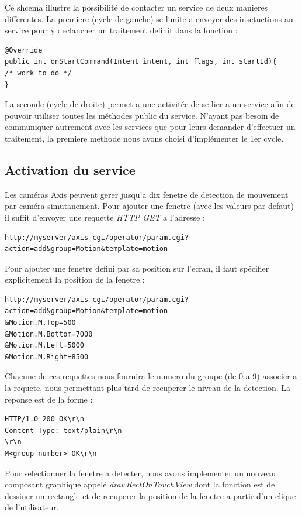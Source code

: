 Ce shcema illustre la possibilité de contacter un service de deux manieres
differentes. La premiere (cycle de gauche) se limite a envoyer des insctuctions 
au service pour y declancher un traitement definit dans la fonction :
\begin{lstlisting}
@Override
public int onStartCommand(Intent intent, int flags, int startId){
/* work to do */
}
\end{lstlisting}
La seconde (cycle de droite) permet a une activitée de se lier a
un service afin de pouvoir utiliser toutes les méthodes public du
service.\newline
N'ayant pas besoin de communiquer autrement avec les services que pour leurs
demander d'effectuer un traitement, la premiere methode nous avons choisi
d'implémenter le 1er cycle.

\subsection{Activation du service}
Les caméras Axis peuvent gerer jusqu'a dix fenetre de detection de mouvement par
caméra simutanement. Pour ajouter une fenetre (avec les valeurs par defaut) il
suffit d'envoyer une requette \textit{HTTP GET} a l'adresse : 
\begin{lstlisting}
http://myserver/axis-cgi/operator/param.cgi?action=add&group=Motion&template=motion
\end{lstlisting}
Pour ajouter une fenetre defini par sa position sur l'ecran, il faut spécifier
explicitement la position de la fenetre :
\begin{lstlisting}
http://myserver/axis-cgi/operator/param.cgi?action=add&group=Motion&template=motion
&Motion.M.Top=500
&Motion.M.Bottom=7000
&Motion.M.Left=5000
&Motion.M.Right=8500
\end{lstlisting}
Chacune de ces requettes nous fournira le numero du groupe (de 0 a 9) associer a
la requete, nous permettant plus tard de recuperer le niveau de la detection.
La reponse est de la forme : 
\begin{lstlisting}
HTTP/1.0 200 OK\r\n
Content-Type: text/plain\r\n
\r\n
M<group number> OK\r\n
\end{lstlisting}
Pour selectionner la fenetre a detecter, nous avons implementer un nouveau
composant graphique appelé \textit{drawRectOnTouchView} dont la fonction est de
dessiner un rectangle et de recuperer la position de la fenetre a partir d'un
clique de l'utilisateur.
